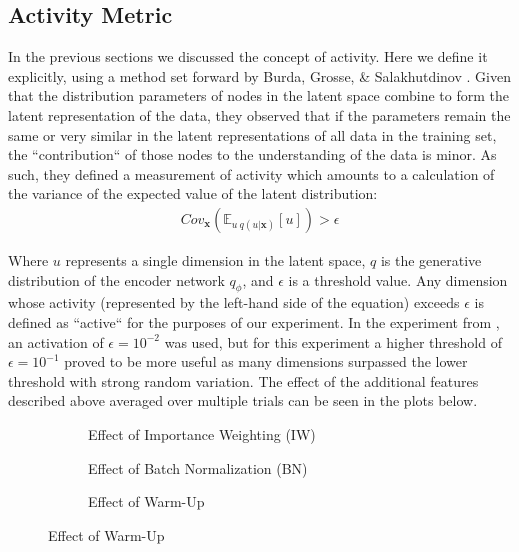 \documentclass{article} %
\numberwithin{figure}{section}
\begin{document}
\subsection{Activity Metric}
In the previous sections we discussed the concept of activity. Here we define it explicitly, using a method set forward by Burda, Grosse, \& Salakhutdinov \cite{Burda2016}. Given that the distribution parameters of nodes in the latent space combine to form the latent representation of the data, they observed that if the parameters remain the same or very similar in the latent representations of all data in the training set, the ``contribution`` of those nodes to the understanding of the data is minor. As such, they defined a measurement of activity which amounts to a calculation of the variance of the expected value of the latent distribution:
\begin{align}
  Cov_{\textbf{x}}\left(\mathbb{E}_{u~q(u|\textbf{x})}[u]\right)>\epsilon
  \label{eq:ACTIVITYMET}
\end{align}
\par Where $u$ represents a single dimension in the latent space, $q$ is the generative distribution of the encoder network $q_\phi$, and $\epsilon$ is a threshold value. Any dimension whose activity (represented by the left-hand side of the equation) exceeds $\epsilon$ is defined as ``active`` for the purposes of our experiment. In the experiment from \cite{Burda2016}, an activation of $\epsilon=10^{-2}$ was used, but for this experiment a higher threshold of $\epsilon=10^{-1}$ proved to be more useful as many dimensions surpassed the lower threshold with strong random variation. The effect of the additional features described above averaged over multiple trials can be seen in the plots below.
\begin{figure}[h]
  \centering
  \begin{subfigure}[t]{0.3\textwidth}
    \resizebox{\linewidth}{!}{}
    \caption{Effect of Importance Weighting (IW)}
    \label{fig:iwlat}
  \end{subfigure}
  \begin{subfigure}[t]{0.3\textwidth}
    \resizebox{\linewidth}{!}{}
    \caption{Effect of Batch Normalization (BN)}
    \label{fig:bnlat}
  \end{subfigure}
  \begin{subfigure}[t]{0.3\textwidth}
    \resizebox{\linewidth}{!}{}
    \caption{Effect of Warm-Up}
    \label{fig:wulat}
  \end{subfigure}
\end{figure}
\end{document}
